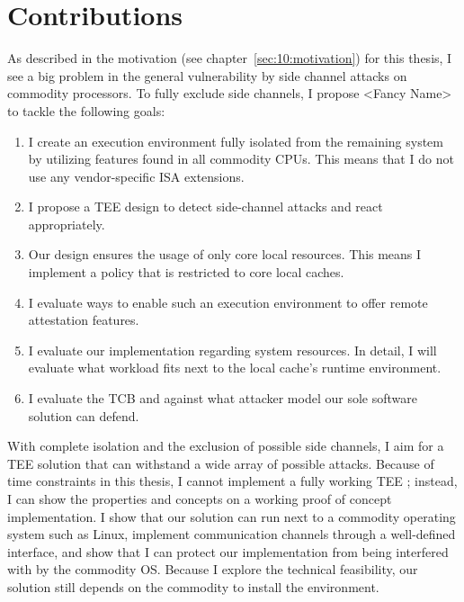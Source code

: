 \section{Contributions}
\label{sec:10:contributions}
As described in the motivation (see chapter~\ref{sec:10:motivation}) for this
thesis, I see a big problem in the general vulnerability by side channel
attacks on commodity processors. To fully exclude side channels, I propose
<Fancy Name> to tackle the following
goals:

\begin{enumerate}
    \item I create an execution environment fully isolated from the remaining
          system by utilizing features found in all commodity CPUs. This means
          that I do not use any vendor-specific ISA extensions.
    \item I propose a TEE design to detect side-channel attacks and react
          appropriately.
    \item Our design ensures the usage of only core local resources. This means
          I implement a policy that is restricted to core local caches.
    \item I evaluate ways to enable such an execution environment to offer
          remote attestation features.
    \item I evaluate our implementation regarding system resources. In detail,
          I will evaluate what workload fits next to the local cache's runtime
          environment.
    \item I evaluate the TCB and against what attacker model our sole software
          solution can defend.
\end{enumerate}

With complete isolation and the exclusion of possible side channels, I aim for
a TEE solution that can withstand a wide array of possible attacks. Because of
time constraints in this thesis, I cannot implement a fully working TEE ;
instead, I can show the properties and concepts on a working proof of concept
implementation. I show that our solution can run next to a commodity operating
system such as Linux, implement communication channels through a well-defined
interface, and show that I can protect our implementation from being interfered
with by the commodity OS. Because I explore the technical feasibility, our
solution still depends on the commodity to install the environment.
